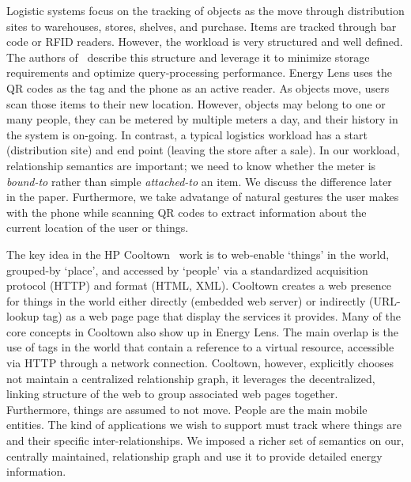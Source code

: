 Logistic systems focus on the tracking of objects as the move through distribution sites to warehouses, stores, shelves,
and purchase.  Items are tracked through bar code or RFID readers.  However, the workload is very structured and well
defined.  The authors of~\cite{rfid_gonz2006} describe this structure and leverage it to minimize storage
requirements and optimize query-processing performance.  Energy Lens uses the QR codes as the tag and the phone as an active
reader.  As objects move, users scan those items to their new location.  However, objects may belong to one or
many people, they can be metered by multiple meters a day, and their history in the system
is on-going.  In contrast, a typical logistics workload has a start (distribution site) and end point (leaving the store
after a sale).  In our workload, relationship semantics are important; we need to know whether the meter is \emph{bound-to}
rather than simple \emph{attached-to} an item.  We discuss the difference later in the paper.
Furthermore, we take advatange of natural gestures the user makes with the phone while scanning QR codes to extract
information about the current location of the user or things.

The key idea in the HP Cooltown~\cite{bridgingphysical,cooltown} work is to web-enable `things' in the world, grouped-by
`place', and accessed by `people' via a standardized acquisition protocol (HTTP) and format (HTML, XML).  
Cooltown creates a web presence for things in the world either directly (embedded web server) or indirectly 
(URL-lookup tag) as a web page page that display the services it provides.  Many of the core concepts in Cooltown 
also show up in Energy Lens.  The main overlap is the use of tags in the world that contain a reference to a virtual 
resource, accessible via HTTP through
a network connection.  Cooltown, however, explicitly chooses not maintain a centralized relationship
graph, it leverages the decentralized, linking structure of the web to group associated web pages together.
Furthermore, things are assumed to not move.  People are the main mobile entities.  The kind of applications
we wish to support must track where things are and their specific inter-relationships.  We imposed a richer set of 
semantics on our, centrally maintained, relationship graph and use it to provide detailed energy information.